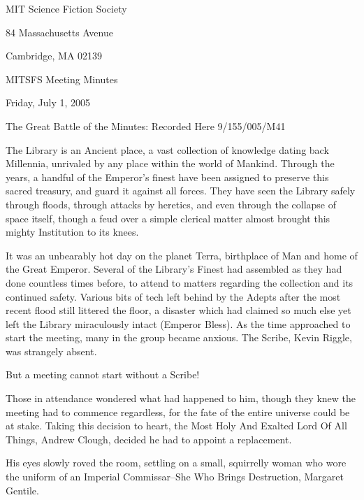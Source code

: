 \documentclass[10pt]{article}
\begin{document}
\begin{center}

MIT Science Fiction Society

84 Massachusetts Avenue

Cambridge, MA 02139

\vspace{12pt}

MITSFS Meeting Minutes

Friday, July 1, 2005

\end{center}

\vspace{18pt}

\setlength{\parskip}{6pt}

\noindent
The Great Battle of the Minutes: Recorded Here 9/155/005/M41

The Library is an Ancient place, a vast collection of knowledge dating back Millennia, unrivaled 
by any place within the world of Mankind. Through the years, a handful of the Emperor's finest have 
been assigned to preserve this sacred treasury, and guard it against all forces. They have seen the 
Library safely through floods, through attacks by heretics, and even through the collapse of space 
itself, though a feud over a simple clerical matter almost brought this mighty Institution to its 
knees.

It was an unbearably hot day on the planet Terra, birthplace of Man and home of the Great Emperor. 
Several of the Library's Finest had assembled as they had done countless times before, to attend to 
matters regarding the collection and its continued safety. Various bits of tech left behind by the 
Adepts after the most recent flood still littered the floor, a disaster which had claimed so much 
else yet left the Library miraculously intact (Emperor Bless). As the time approached to start the 
meeting, many in the group became anxious. The Scribe, Kevin Riggle, was strangely absent. 

But a meeting cannot start without a Scribe!

Those in attendance wondered what had happened to him, though they knew the meeting had to commence 
regardless, for the fate of the entire universe could be at stake. Taking this decision to heart, 
the Most Holy And Exalted Lord Of All Things, Andrew Clough, decided he had to appoint a 
replacement.

His eyes slowly roved the room, settling on a small, squirrelly woman who wore the uniform of an 
Imperial Commissar--She Who Brings Destruction, Margaret Gentile.
\end{document}
